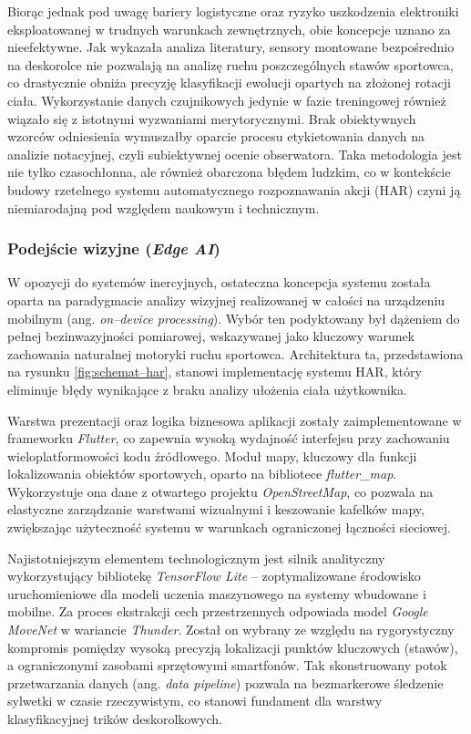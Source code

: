             Biorąc jednak pod uwagę bariery logistyczne oraz ryzyko uszkodzenia elektroniki eksploatowanej w trudnych warunkach zewnętrznych, obie koncepcje uznano za nieefektywne. Jak wykazała analiza literatury, sensory montowane bezpośrednio na deskorolce nie pozwalają na analizę ruchu poszczególnych stawów sportowca, co drastycznie obniża precyzję klasyfikacji ewolucji opartych na złożonej rotacji ciała. Wykorzystanie danych czujnikowych jedynie w fazie treningowej również wiązało się z istotnymi wyzwaniami merytorycznymi. Brak obiektywnych wzorców odniesienia wymuszałby oparcie procesu etykietowania danych na analizie notacyjnej, czyli subiektywnej ocenie obserwatora. Taka metodologia jest nie tylko czasochłonna, ale również obarczona błędem ludzkim, co w kontekście budowy rzetelnego systemu automatycznego rozpoznawania akcji (HAR) czyni ją niemiarodajną pod względem naukowym i technicznym. 

        \subsubsection{Podejście wizyjne (\textit{Edge AI})}
                    
            W opozycji do systemów inercyjnych, ostateczna koncepcja systemu została oparta na paradygmacie analizy wizyjnej realizowanej w całości na urządzeniu mobilnym (ang. \textit{on–device processing}). Wybór ten podyktowany był dążeniem do pełnej bezinwazyjności pomiarowej, wskazywanej jako kluczowy warunek zachowania naturalnej motoryki ruchu sportowca. Architektura ta, przedstawiona na rysunku \ref{fig:schemat–har}, stanowi implementację systemu HAR, który eliminuje błędy wynikające z braku analizy ułożenia ciała użytkownika.

            Warstwa prezentacji oraz logika biznesowa aplikacji zostały zaimplementowane w frameworku \textit{Flutter}, co zapewnia wysoką wydajność interfejsu przy zachowaniu wieloplatformowości kodu źródłowego. Moduł mapy, kluczowy dla funkcji lokalizowania obiektów sportowych, oparto na bibliotece \textit{flutter\_map}. Wykorzystuje ona dane z otwartego projektu \textit{OpenStreetMap}, co pozwala na elastyczne zarządzanie warstwami wizualnymi i keszowanie kafelków mapy, zwiększając użyteczność systemu w warunkach ograniczonej łączności sieciowej.

            Najistotniejszym elementem technologicznym jest silnik analityczny wykorzystujący bibliotekę \textit{TensorFlow Lite} – zoptymalizowane środowisko uruchomieniowe dla modeli uczenia maszynowego na systemy wbudowane i mobilne. Za proces ekstrakcji cech przestrzennych odpowiada model \textit{Google MoveNet} w wariancie \textit{Thunder}. Został on wybrany ze względu na rygorystyczny kompromis pomiędzy wysoką precyzją lokalizacji punktów kluczowych (stawów), a ograniczonymi zasobami sprzętowymi smartfonów. Tak skonstruowany potok przetwarzania danych (ang. \textit{data pipeline}) pozwala na bezmarkerowe śledzenie sylwetki w czasie rzeczywistym, co stanowi fundament dla warstwy klasyfikacyjnej trików deskorolkowych.

